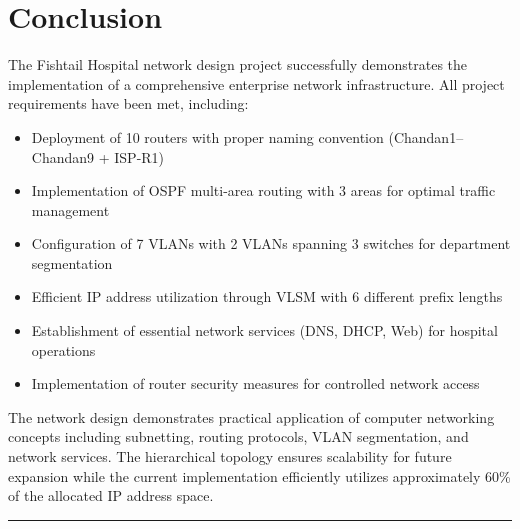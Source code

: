\documentclass[12pt,a4paper]{report}
\begin{document}
\chapter{Conclusion}

The Fishtail Hospital network design project successfully demonstrates the implementation of a comprehensive enterprise network infrastructure. All project requirements have been met, including:

\begin{itemize}[noitemsep]
    \item Deployment of 10 routers with proper naming convention (Chandan1--Chandan9 + ISP-R1)
    \item Implementation of OSPF multi-area routing with 3 areas for optimal traffic management
    \item Configuration of 7 VLANs with 2 VLANs spanning 3 switches for department segmentation
    \item Efficient IP address utilization through VLSM with 6 different prefix lengths
    \item Establishment of essential network services (DNS, DHCP, Web) for hospital operations
    \item Implementation of router security measures for controlled network access
\end{itemize}

The network design demonstrates practical application of computer networking concepts including subnetting, routing protocols, VLAN segmentation, and network services. The hierarchical topology ensures scalability for future expansion while the current implementation efficiently utilizes approximately 60\% of the allocated IP address space.

\vspace{1cm}
\begin{center}
\rule{0.4\textwidth}{0.4pt}
\end{center}
\end{document}
